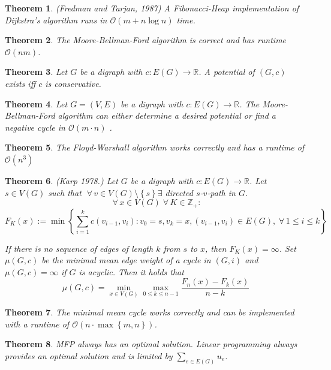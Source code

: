\documentclass{article}
\newtheorem{theorem}{Theorem}
\newcommand{\set}[1]{\left\{#1\right\}}
\newcommand{\gath}[2]{$#1$-$#2$-path} %
\newcommand{\fall}{\;\forall\,}
\begin{document}
\begin{theorem}\label{satz-3.3}
  (Fredman and Tarjan, 1987)
  A Fibonacci-Heap implementation of Dijkstra's algorithm runs in $\mathcal{O}(m + n\log{n})$ time.
\end{theorem}
\begin{theorem}\label{satz-3.4}
  The Moore-Bellman-Ford algorithm is correct and has runtime $\mathcal{O}(nm)$.
\end{theorem}
\begin{theorem}\label{satz-3.5}
Let $G$ be a digraph with $c: E(G) \rightarrow \mathbb{R}$. A potential of $(G, c)$ exists iff $c$ is conservative.
\end{theorem}
\begin{theorem}\label{korollar-3.5}
  Let $G = (V, E)$ be a digraph with $c: E(G) \rightarrow \mathbb{R}$. The Moore-Bellman-Ford algorithm can either determine a desired potential or find a negative cycle in $\mathcal{O}(m\cdot n)$ .
\end{theorem}
\begin{theorem}\label{satz-3.6}
  The Floyd-Warshall algorithm works correctly and has a runtime of $\mathcal{O}(n^3)$
\end{theorem}
\begin{theorem}\label{satz-3.10}
  (Karp 1978.)
  Let $G$ be a digraph with $c: E(G) \rightarrow \mathbb{R}$. Let $s \in V(G)$ such that $\fall v \in V(G) \setminus \set{s} \exists$ directed \gath sv in $G$.
  \[
    \fall x \in V(G) \fall K \in \mathbb{Z}_+:
  \] \[
    F_K(x) := \min\set{
      \sum_{i=1}^k c(v_{i-1}, v_i):
        v_0 = s, v_k = x, (v_{i-1}, v_i) \in E(G),
        \fall 1 \leq i \leq k
    }
  \]

  If there is no sequence of edges of length $k$ from $s$ to $x$, then $F_K(x) = \infty$.
  Set $\mu(G, c)$ be the minimal mean edge weight of a cycle in $(G, i)$ and $\mu(G, c) = \infty$ if $G$ is acyclic. Then it holds that
  \[
    \mu(G, c) = \min_{x \in V(G)} \max_{0 \leq k \leq n-1} \frac{F_n(x) - F_k(x)}{n-k}
  \]
\end{theorem}
\begin{theorem}\label{korollar-3.11}
  The minimal mean cycle works correctly and can be implemented with a runtime of $\mathcal{O}(n \cdot\max\set{m,n})$.
\end{theorem}
\begin{theorem}
  \label{proposition-4.1}
  MFP always has an optimal solution. Linear programming always provides an optimal solution and is limited by $\sum_{e \in E(G)} u_e$.
\end{theorem}
\end{document}
